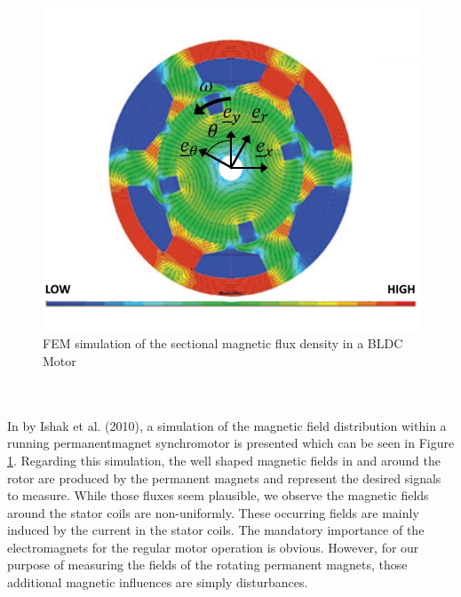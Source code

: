 \documentclass[english]{isasthesis}
\begin{document}
    		\begin{figure}[t]
    		\centering
    			\includegraphics[width=0.8\linewidth]{figures/MagneticFluxBLDC.jpg}   		
    		\caption{FEM simulation of the sectional magnetic flux density in a BLDC Motor \cite{ishak2010electrically}}
    		\label{fig:simulation pmsm}
    		\end{figure}
    	\\\\In \cite{ishak2010electrically} by Ishak et al. (2010), a simulation of the magnetic field distribution within a running permanentmagnet synchromotor is presented which can be seen in Figure \ref{fig:simulation pmsm}. Regarding this simulation, the well shaped magnetic fields in and around the rotor are produced by the permanent magnets and represent the desired signals to measure. While those fluxes seem plausible, we observe the magnetic fields around the stator coils are non-uniformly. These occurring fields are mainly induced by the current in the stator coils. The mandatory importance of the electromagnets for the regular motor operation is obvious. However, for our purpose of measuring the fields of the rotating permanent magnets, those additional magnetic influences are simply disturbances.
    		
\end{document}
